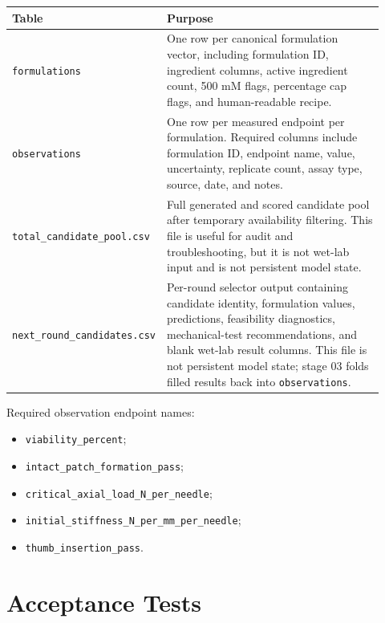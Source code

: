 \documentclass[11pt]{article}
\newcommand{\code}[1]{\texttt{#1}}
\newcommand{\metric}[1]{\texttt{#1}}
\begin{document}
\begin{longtable}{@{}p{0.25\linewidth}p{0.67\linewidth}@{}}
\toprule
\textbf{Table} & \textbf{Purpose} \\
\midrule
\code{formulations} &
One row per canonical formulation vector, including formulation ID, ingredient columns,
active ingredient count, 500 mM flags, percentage cap flags, and human-readable recipe. \\
\code{observations} &
One row per measured endpoint per formulation. Required columns include formulation ID,
endpoint name, value, uncertainty, replicate count, assay type, source, date, and notes. \\
\code{total\_candidate\_pool.csv} &
Full generated and scored candidate pool after temporary availability filtering. This
file is useful for audit and troubleshooting, but it is not wet-lab input and is not
persistent model state. \\
\code{next\_round\_candidates.csv} &
Per-round selector output containing candidate identity, formulation values,
predictions, feasibility diagnostics, mechanical-test recommendations, and blank
wet-lab result columns. This file is not persistent model state; stage 03 folds filled
results back into \code{observations}. \\
\bottomrule
\end{longtable}

Required observation endpoint names:
\begin{itemize}
    \item \metric{viability\_percent};
    \item \metric{intact\_patch\_formation\_pass};
    \item \metric{critical\_axial\_load\_N\_per\_needle};
    \item \metric{initial\_stiffness\_N\_per\_mm\_per\_needle};
    \item \metric{thumb\_insertion\_pass}.
\end{itemize}

\section{Acceptance Tests}
\end{document}
